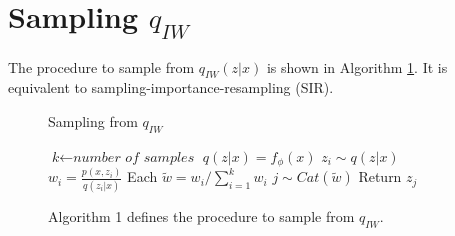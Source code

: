 \documentclass{article} %
\begin{document}





\section{Sampling \texorpdfstring{$q_{IW}$}{}}



The procedure to sample from $q_{IW}(z|x)$ is shown in Algorithm \ref{algo1}.
It is equivalent to sampling-importance-resampling (SIR). 



\begin{figure}[t]
\centering
\begin{centering}
\begin{minipage}[t]{0.49\columnwidth}
\begin{algorithm}[H]
\caption{Sampling from $q_{IW}$}\label{algo1}
\begin{algorithmic}[1]
    \State $\textit{k} \gets \textit{number of samples}$
    \State $q(z|x) = f_\phi(x)$
        \State $z_i \sim q(z|x)$
        \State $w_i = \frac{p(x,z_i)}{q(z_i|x)}$
    \EndFor    
    \State Each $\tilde w = w_i/\sum_{i=1}^{k} w_i$
    \State $j \sim Cat(\tilde{w})$
    \State Return $z_j$
\end{algorithmic}
\end{algorithm}
\end{minipage}
\end{centering}

\hfill
\caption{Algorithm 1 defines the procedure to sample from $q_{IW}$.
}
\end{figure}
\end{document}
